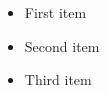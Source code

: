 \documentclass[landscape]{slides}
\begin{document}
\begin{slide}
\begin{itemize}
\item First item
\item Second item
\item Third item
\end{itemize}
\end{slide}
\end{document}
